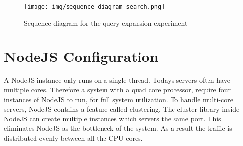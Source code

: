 \begin{figure}[h!]
\centering \texttt{[image: img/sequence-diagram-search.png]}
\caption{Sequence diagram for the query expansion experiment}
\label{fig:sequence-diagram-search}
\end{figure}

\section{NodeJS Configuration}
A NodeJS instance only runs on a single thread.
Todays servers often have multiple cores.
Therefore a system with a quad core processor, require four instances of NodeJS to run, for full system utilization.
To handle multi-core servers, NodeJS contains a feature called clustering.
The cluster library inside NodeJS can create multiple instances which servers the same port.
This eliminates NodeJS as the bottleneck of the system.
As a result the traffic is distributed evenly between all the CPU cores.
